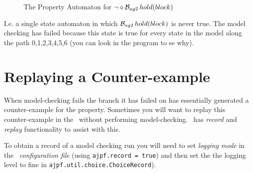 \begin{figure}[htb]
\begin{center}
\end{center}
\caption{The Property Automaton for $\neg \diamond \mathrm{{\cal B}}_{ag2} \, hold(block)$}
\label{fig:automaton}
\end{figure}

I.e. a single state automaton in which $\mathrm{{\cal B}}_{ag2} \, hold(block)$ is never true.  The model checking has failed because this state is true for every state in the model along the path 0,1,2,3,4,5,6 (you can look in the program to se why).

\section{Replaying a Counter-example}
When model-checking fails the branch it has failed on has essentially generated a counter-example for the property.  Sometimes you will want to replay this counter-example in the \ail\ without performing model-checking.  \ajpf\ has \emph{record} and \emph{replay} functionality to assist with this.

To obtain a record of a model checking run you will need to set \emph{logging mode} in the \emph{\ail\ configuration file} (using \texttt{ajpf.record = true}) and then set the the logging level to fine in \texttt{ajpf.util.choice.ChoiceRecord}).

